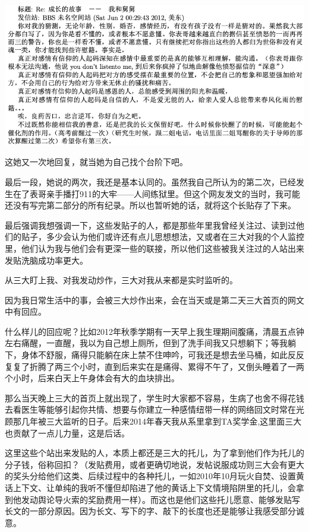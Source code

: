 \documentclass[9pt, b5paper]{article}
\begin{document}
\begin{center}
\includegraphics[width=.9\linewidth]{./pic/p1p115-3.png}
\end{center}

这她又一次地回复，就当她为自己找个台阶下吧。

最后一段，她说的两次，我还是基本认同的。虽然我自己所认为的第二次，已经发生在了表哥亲手播打911的大牢——人间练狱里。但这个网友发文的当时，我可能还没有写完第二部分的所有纪录。所以也暂听她的话，就将这个长贴存了下来。 

最后强调我想强调一下，这些发贴子的人，都是那些年里我曾经关注过、读到过他们的贴子，多少会认为他们或许还有点儿思想想法，又或者在三大对我的个人监控里，他们认为我与他们会有更深一些的联接，所以他们这些被我关注过的人站出来发贴洗脑成功率更大。

从三大盯上我、对我发动炒作，三大对我从来都是实时监听的。

因为我日常生活中的事，会被三大炒作出来，会在当天或是第二天三大首页的网文中有回应。

什么样儿的回应呢？比如2012年秋季学期有一天早上我生理期间腹痛，清晨五点钟左右痛醒，一直醒，我以为自己想上厕所，但到了洗手间我又只想躺下；等我躺下，身体不舒服，痛得只能躺在床上禁不住呻吟，可我还是想去坐马桶，如此反反复复了折腾了两三个小时，直到后来实在是痛得、累得不午了，又倒头睡着了一两个小时，后来白天上午身体会有大的血块排出。

那么当天晚上三大的首页上就出现了，学生时大家都不容易，生病了也舍不得花钱去看医生等能够引起你共情、想要与你建立一种感情纽带一样的网络回文时常在光顾那几年被三大监听的日子。后来2014年春天我从系里拿到TA奖学金,这里面三大也贡献了一点儿力量，这是后话。 

这里这些个站出来发贴的人，本质上都还是三大的托儿，为了拿到他们作为托儿的分子钱，俗称回扣？（发贴费用，或者更确切地说，发帖说服成功则三大会有更大的奖头分给他们这类、后续过程中的各种托儿，一如2010年10月玩火自焚、设置黄话上下文、让单纯的我听不懂但却陷进了他的黄话上下文情境陷阱里的托儿，会拿到他发动舆论导火索的奖励费用一样）。而这也是他们这些托儿愿意、能够发贴写长文的一部分原因。因为长文、写下的字、敲下的长度也还是能够让我感受部分诚意。
\end{document}
